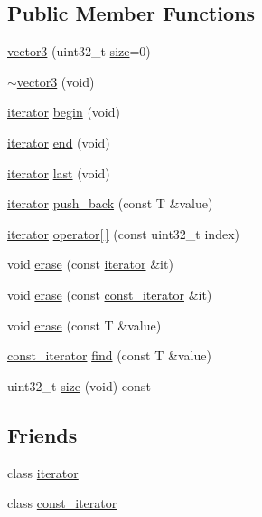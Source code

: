 \subsection*{Public Member Functions}
\begin{DoxyCompactItemize}
\item 
\hyperlink{classcrap_1_1vector3_a02c81bb58c9c76355735e49ff38e2a98}{vector3} (uint32\+\_\+t \hyperlink{classcrap_1_1vector3_a63bb2c4185dcccfdf5fdecfe35e7d218}{size}=0)
\item 
\hyperlink{classcrap_1_1vector3_a514b85d8cf990d4598a11ff2d146c77b}{$\sim$vector3} (void)
\item 
\hyperlink{classcrap_1_1vector3_1_1iterator}{iterator} \hyperlink{classcrap_1_1vector3_a8e9f53a545910aadd9ca1175ec80d22c}{begin} (void)
\item 
\hyperlink{classcrap_1_1vector3_1_1iterator}{iterator} \hyperlink{classcrap_1_1vector3_a88c7aa8c07acf5889fcfb2a24afb43c4}{end} (void)
\item 
\hyperlink{classcrap_1_1vector3_1_1iterator}{iterator} \hyperlink{classcrap_1_1vector3_abd3cdc0b579713348087d491ca42eb02}{last} (void)
\item 
\hyperlink{classcrap_1_1vector3_1_1iterator}{iterator} \hyperlink{classcrap_1_1vector3_a812877d63db21178e4d8b8d0f4246e00}{push\+\_\+back} (const T \&value)
\item 
\hyperlink{classcrap_1_1vector3_1_1iterator}{iterator} \hyperlink{classcrap_1_1vector3_ad19b218eea5e65a83b048adc363a986e}{operator\mbox{[}$\,$\mbox{]}} (const uint32\+\_\+t index)
\item 
void \hyperlink{classcrap_1_1vector3_a5e58b3024609008815818f2f6203ac25}{erase} (const \hyperlink{classcrap_1_1vector3_1_1iterator}{iterator} \&it)
\item 
void \hyperlink{classcrap_1_1vector3_a1551037e3f500f5a6778fbedbb2c1c40}{erase} (const \hyperlink{classcrap_1_1vector3_1_1const__iterator}{const\+\_\+iterator} \&it)
\item 
void \hyperlink{classcrap_1_1vector3_a0df305bf3b008b46dbbe5ddd197c3a8b}{erase} (const T \&value)
\item 
\hyperlink{classcrap_1_1vector3_1_1const__iterator}{const\+\_\+iterator} \hyperlink{classcrap_1_1vector3_a8869f64f9c2af37a13742084155d0776}{find} (const T \&value)
\item 
uint32\+\_\+t \hyperlink{classcrap_1_1vector3_a63bb2c4185dcccfdf5fdecfe35e7d218}{size} (void) const 
\end{DoxyCompactItemize}
\subsection*{Friends}
\begin{DoxyCompactItemize}
\item 
class \hyperlink{classcrap_1_1vector3_a67171474c4da6cc8efe0c7fafefd2b2d}{iterator}
\item 
class \hyperlink{classcrap_1_1vector3_ac220ce1c155db1ac44146c12d178056f}{const\+\_\+iterator}
\end{DoxyCompactItemize}



